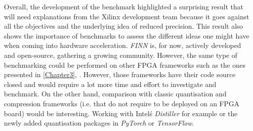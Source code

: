 Overall, the development of the benchmark highlighted a surprising result that will need explanations from the Xilinx development team because it goes against all the objectives and the underlying idea of reduced precision. This result also shows the importance of benchmarks to assess the different ideas one might have when coming into hardware acceleration. \emph{FINN} is, for now, actively developed and open-source, gathering a growing community. However, the same type of benchmarking could be performed on other FPGA frameworks such as the ones presented in \ref{Chapter3}, \cite{Andri2016, Zhao2016, Venieris2017, Ding2019, Jahanshahi2019}. However, those frameworks have their code source closed and would require a lot more time and effort to investigate and benchmark. On the other hand, comparison with classic quantisation and compression frameworks (i.e. that do not require to be deployed on an FPGA board) would be interesting. Working with Intel\'s \emph{Distiller} \cite{Nzmora2019} for example or the newly added quantisation packages in \emph{PyTorch} or \emph{TensorFlow}.
